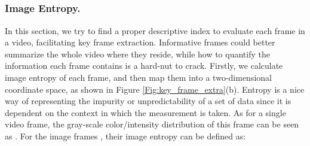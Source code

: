 \documentclass[5p]{elsarticle}
\begin{document}
\begin{figure*}[!htbp]
	\begin{centering}
		\centering
		\setcounter{subfigure}{0}
		 \\
		 \\
		 \\
		 \\
		\caption{The framework of the proposed key frames extraction method.}
		\label{Fig:key_frame_extra}
	\end{centering}
\end{figure*}

\subsubsection{Image Entropy.}
In this section, we try to find a proper descriptive index to evaluate each frame in a video, facilitating key frame extraction.
Informative frames could better summarize the whole video where they reside, while how to quantify the information each frame contains is a hard-nut to crack.
Firstly, we calculate image entropy of each frame, and then map them into a two-dimensional coordinate space, as shown in  Figure \ref{Fig:key_frame_extra}(b).
Entropy is a nice way of representing the impurity or unpredictability of a set of data since it is dependent on the context in which the measurement is taken.
As for a single video frame, the gray-scale color/intensity distribution of this frame can be seen as .
For the image frames , their image entropy can be defined as:
\end{document}

